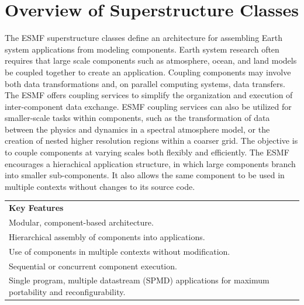 %

\section{Overview of Superstructure Classes}

The ESMF superstructure classes define an architecture for assembling
Earth system applications from modeling components.  Earth system research 
often requires that large scale components such as atmosphere, ocean,
and land models be coupled together to create an application.  
Coupling components may involve both data transformations and, on 
parallel computing systems, data transfers.  The ESMF offers coupling 
services to simplify the organization and execution of inter-component 
data exchange.  ESMF coupling services can also be utilized for 
smaller-scale tasks within components, such as the 
transformation of data between the physics and dynamics in a spectral 
atmosphere model, or the creation of nested higher resolution regions 
within a coarser grid.  The objective is to couple components at varying 
scales both flexibly and efficiently.  The ESMF encourages a hierachical
application structure, in which large components branch into 
smaller sub-components.  It also allows the same component to be 
used in multiple contexts without changes to its source code.

\begin{center}  
\begin{tabular}{|p{6in}|}
\hline
\vspace{.01in}
{\bf Key Features} \\[.01in]
Modular, component-based architecture. \\
Hierarchical assembly of components into applications.\\
Use of components in multiple contexts without modification.\\
Sequential or concurrent component execution.\\
Single program, multiple datastream (SPMD) applications for 
maximum portability and reconfigurability.\\[.03in] \hline
\end{tabular}
\end{center}

